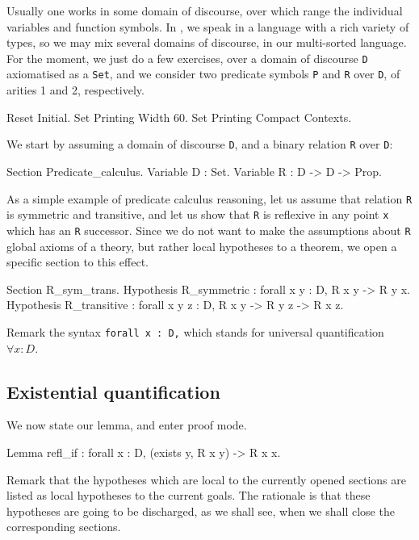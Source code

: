 \documentclass[11pt,a4paper]{book}
\begin{document}
Usually one works in some domain of discourse, over which range the individual 
variables and function symbols. In \Coq{}, we speak in a language with a rich
variety of types, so we may mix several domains of discourse, in our 
multi-sorted language. For the moment, we just do a few exercises, over a 
domain of discourse \verb:D: axiomatised as a \verb:Set:, and we consider two 
predicate symbols  \verb:P: and \verb:R: over \verb:D:, of arities 
1 and 2, respectively.

\begin{coq_eval}
Reset Initial.
Set Printing Width 60.
Set Printing Compact Contexts.
\end{coq_eval}

We start by assuming a domain of
discourse \verb:D:, and a binary relation \verb:R:  over \verb:D:: 
\begin{coq_example}
Section Predicate_calculus.
Variable D : Set.
Variable R : D -> D -> Prop.
\end{coq_example}

As a simple example of predicate calculus reasoning, let us assume
that relation \verb:R: is symmetric and transitive, and let us show that
\verb:R: is reflexive in any point \verb:x: which has an \verb:R: successor.
Since we do not want to make the assumptions about \verb:R: global axioms of 
a theory, but rather local hypotheses to a theorem, we open a specific
section to this effect.
\begin{coq_example}
Section R_sym_trans.
Hypothesis R_symmetric : forall x y : D, R x y -> R y x.
Hypothesis R_transitive :
    forall x y z : D, R x y -> R y z -> R x z.
\end{coq_example}

Remark the syntax \verb+forall x : D,+ which stands for universal quantification
$\forall x : D$.

\subsection{Existential quantification}

We now state our lemma, and enter proof mode.
\begin{coq_example}
Lemma refl_if : forall x : D, (exists y, R x y) -> R x x.
\end{coq_example}

Remark that the hypotheses which are local to the currently opened sections
are listed as local hypotheses to the current goals.
The rationale is that these hypotheses are going to be discharged, as we
shall see, when we shall close the corresponding sections.
\end{document}
